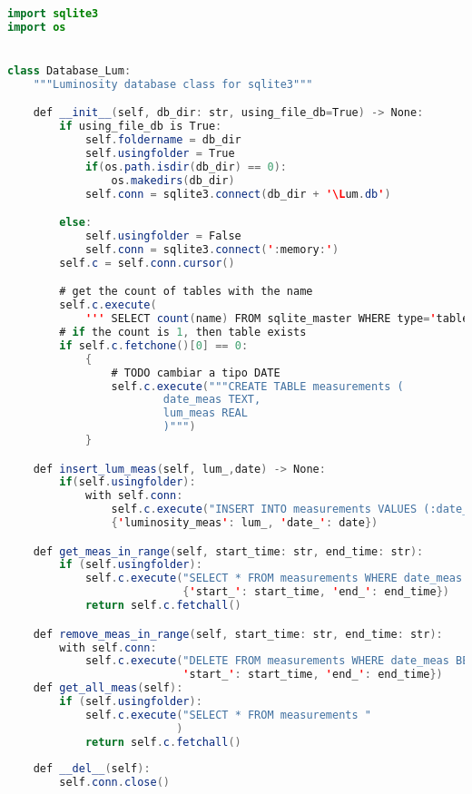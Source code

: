 \begin{lstlisting}[language=Java]
import sqlite3
import os


class Database_Lum:
    """Luminosity database class for sqlite3"""

    def __init__(self, db_dir: str, using_file_db=True) -> None:
        if using_file_db is True:
            self.foldername = db_dir
            self.usingfolder = True
            if(os.path.isdir(db_dir) == 0):
                os.makedirs(db_dir)
            self.conn = sqlite3.connect(db_dir + '\Lum.db')

        else:
            self.usingfolder = False
            self.conn = sqlite3.connect(':memory:')
        self.c = self.conn.cursor()

        # get the count of tables with the name
        self.c.execute(
            ''' SELECT count(name) FROM sqlite_master WHERE type='table' AND name='measurements' ''')
        # if the count is 1, then table exists
        if self.c.fetchone()[0] == 0:
            {
                # TODO cambiar a tipo DATE
                self.c.execute("""CREATE TABLE measurements ( 
                        date_meas TEXT,
                        lum_meas REAL
                        )""")
            }

    def insert_lum_meas(self, lum_,date) -> None:
        if(self.usingfolder):
            with self.conn:
                self.c.execute("INSERT INTO measurements VALUES (:date_, :luminosity_meas)", 
                {'luminosity_meas': lum_, 'date_': date})

    def get_meas_in_range(self, start_time: str, end_time: str):
        if (self.usingfolder):
            self.c.execute("SELECT * FROM measurements WHERE date_meas BETWEEN (:start_) AND (:end_)",
                           {'start_': start_time, 'end_': end_time})
            return self.c.fetchall()

    def remove_meas_in_range(self, start_time: str, end_time: str):
        with self.conn:
            self.c.execute("DELETE FROM measurements WHERE date_meas BETWEEN (:start_) AND (:end_)", {
                           'start_': start_time, 'end_': end_time})
    def get_all_meas(self):
        if (self.usingfolder):
            self.c.execute("SELECT * FROM measurements "
                          )
            return self.c.fetchall()
            
    def __del__(self):
        self.conn.close()


\end{lstlisting}

